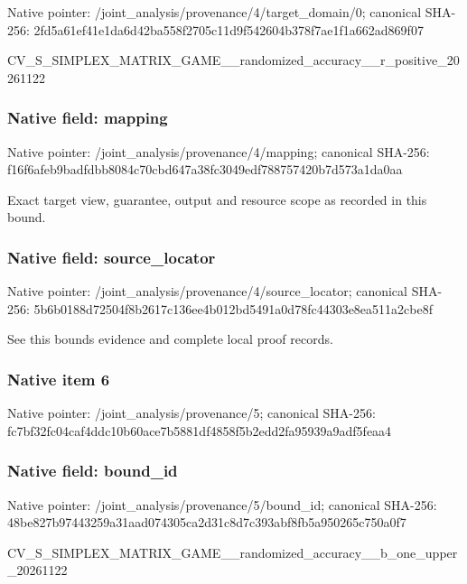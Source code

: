 \documentclass[10pt,a4paper]{article}
\begin{document}
Native pointer: /joint\_analysis/provenan\allowbreak{}ce/4/target\_domain/0; canonical SHA-256: 2fd5a61ef41e1da6d42ba558\allowbreak{}f2705c11d9f542604b378f7a\allowbreak{}e1f1a662ad869f07


CV\_S\_SIMPLEX\_MATRIX\_GAME\allowbreak{}\_\_randomized\_accuracy\_\_r\allowbreak{}\_positive\_20261122


\subsubsection{Native field: mapping}


Native pointer: /joint\_analysis/provenance/4/mapping; canonical SHA-256: f16f6afeb9badfdbb8084c70\allowbreak{}cbd647a38fc3049edf788757\allowbreak{}420b7d573a1da0aa


Exact target view, guarantee, output and resource scope as recorded in this bound.


\subsubsection{Native field: source\_locator}


Native pointer: /joint\_analysis/provenan\allowbreak{}ce/4/source\_locator; canonical SHA-256: 5b6b0188d72504f8b2617c13\allowbreak{}6ee4b012bd5491a0d78fc443\allowbreak{}03e8ea511a2cbe8f


See this bounds evidence and complete local proof records.


\subsubsection{Native item 6}


Native pointer: /joint\_analysis/provenance/5; canonical SHA-256: fc7bf32fc04caf4ddc10b60a\allowbreak{}ce7b5881df4858f5b2edd2fa\allowbreak{}95939a9adf5feaa4



\subsubsection{Native field: bound\_id}


Native pointer: /joint\_analysis/provenance/5/bound\_id; canonical SHA-256: 48be827b97443259a31aad07\allowbreak{}4305ca2d31c8d7c393abf8fb\allowbreak{}5a950265c750a0f7


CV\_S\_SIMPLEX\_MATRIX\_GAME\allowbreak{}\_\_randomized\_accuracy\_\_b\allowbreak{}\_one\_upper\_20261122
\end{document}
